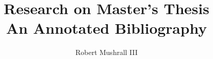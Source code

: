 \documentclass [11pt]{article}
\title{Research on Master's Thesis\\\medskip An Annotated Bibliography}
\author{Robert Mushrall III}
\begin{document}
\maketitle
\nocite{*}


\end{document}
